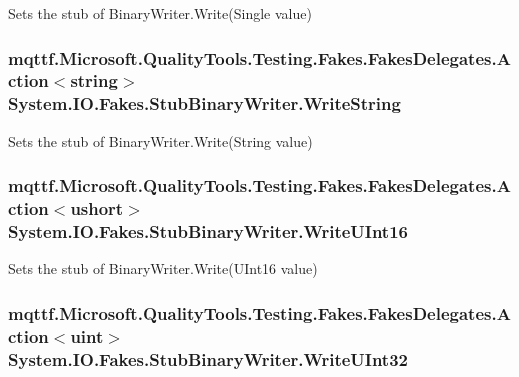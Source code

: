 Sets the stub of Binary\-Writer.\-Write(\-Single value)

\hypertarget{class_system_1_1_i_o_1_1_fakes_1_1_stub_binary_writer_abf71f0980261443bac091400ce1e2cee}{
\subsubsection[{Write\-String}]{\setlength{\rightskip}{0pt plus 5cm}mqttf.\-Microsoft.\-Quality\-Tools.\-Testing.\-Fakes.\-Fakes\-Delegates.\-Action$<$string$>$ System.\-I\-O.\-Fakes.\-Stub\-Binary\-Writer.\-Write\-String}}\label{class_system_1_1_i_o_1_1_fakes_1_1_stub_binary_writer_abf71f0980261443bac091400ce1e2cee}


Sets the stub of Binary\-Writer.\-Write(\-String value)

\hypertarget{class_system_1_1_i_o_1_1_fakes_1_1_stub_binary_writer_adc40a1ae6c9adaf93435167e220b5b87}{
\subsubsection[{Write\-U\-Int16}]{\setlength{\rightskip}{0pt plus 5cm}mqttf.\-Microsoft.\-Quality\-Tools.\-Testing.\-Fakes.\-Fakes\-Delegates.\-Action$<$ushort$>$ System.\-I\-O.\-Fakes.\-Stub\-Binary\-Writer.\-Write\-U\-Int16}}\label{class_system_1_1_i_o_1_1_fakes_1_1_stub_binary_writer_adc40a1ae6c9adaf93435167e220b5b87}


Sets the stub of Binary\-Writer.\-Write(\-U\-Int16 value)

\hypertarget{class_system_1_1_i_o_1_1_fakes_1_1_stub_binary_writer_a0e0a04f3ca4857608728d00600542551}{
\subsubsection[{Write\-U\-Int32}]{\setlength{\rightskip}{0pt plus 5cm}mqttf.\-Microsoft.\-Quality\-Tools.\-Testing.\-Fakes.\-Fakes\-Delegates.\-Action$<$uint$>$ System.\-I\-O.\-Fakes.\-Stub\-Binary\-Writer.\-Write\-U\-Int32}}\label{class_system_1_1_i_o_1_1_fakes_1_1_stub_binary_writer_a0e0a04f3ca4857608728d00600542551}


